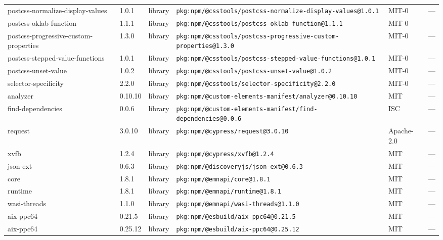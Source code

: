 \documentclass[11pt,a4paper]{article}
\begin{document}
\begin{longtable}{|p{4cm}|p{2cm}|p{1.6cm}|p{5cm}|p{1.5cm}|p{3.5cm}|}
\raggedright postcss-normalize-display-values & 1.0.1 & library & \small\texttt{pkg:npm/@csstools/postcss-normalize-display-values@1.0.1} & MIT-0 & \small — \\
\raggedright postcss-oklab-function & 1.1.1 & library & \small\texttt{pkg:npm/@csstools/postcss-oklab-function@1.1.1} & MIT-0 & \small — \\
\raggedright postcss-progressive-custom-properties & 1.3.0 & library & \small\texttt{pkg:npm/@csstools/postcss-progressive-custom-properties@1.3.0} & MIT-0 & \small — \\
\raggedright postcss-stepped-value-functions & 1.0.1 & library & \small\texttt{pkg:npm/@csstools/postcss-stepped-value-functions@1.0.1} & MIT-0 & \small — \\
\raggedright postcss-unset-value & 1.0.2 & library & \small\texttt{pkg:npm/@csstools/postcss-unset-value@1.0.2} & MIT-0 & \small — \\
\raggedright selector-specificity & 2.2.0 & library & \small\texttt{pkg:npm/@csstools/selector-specificity@2.2.0} & MIT-0 & \small — \\
\raggedright analyzer & 0.10.10 & library & \small\texttt{pkg:npm/@custom-elements-manifest/analyzer@0.10.10} & MIT & \small — \\
\raggedright find-dependencies & 0.0.6 & library & \small\texttt{pkg:npm/@custom-elements-manifest/find-dependencies@0.0.6} & ISC & \small — \\
\raggedright request & 3.0.10 & library & \small\texttt{pkg:npm/@cypress/request@3.0.10} & Apache-2.0 & \small — \\
\raggedright xvfb & 1.2.4 & library & \small\texttt{pkg:npm/@cypress/xvfb@1.2.4} & MIT & \small — \\
\raggedright json-ext & 0.6.3 & library & \small\texttt{pkg:npm/@discoveryjs/json-ext@0.6.3} & MIT & \small — \\
\raggedright core & 1.8.1 & library & \small\texttt{pkg:npm/@emnapi/core@1.8.1} & MIT & \small — \\
\raggedright runtime & 1.8.1 & library & \small\texttt{pkg:npm/@emnapi/runtime@1.8.1} & MIT & \small — \\
\raggedright wasi-threads & 1.1.0 & library & \small\texttt{pkg:npm/@emnapi/wasi-threads@1.1.0} & MIT & \small — \\
\raggedright aix-ppc64 & 0.21.5 & library & \small\texttt{pkg:npm/@esbuild/aix-ppc64@0.21.5} & MIT & \small — \\
\raggedright aix-ppc64 & 0.25.12 & library & \small\texttt{pkg:npm/@esbuild/aix-ppc64@0.25.12} & MIT & \small — \\

\end{longtable}
\end{document}
